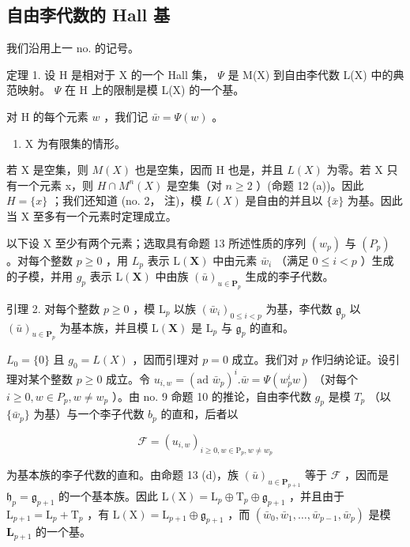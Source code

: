 \subsection{自由李代数的 Hall 基}

我们沿用上一 no. 的记号。

定理 1. 设 H 是相对于 X 的一个 Hall 集， \(\Psi\) 是 M(X) 到自由李代数 L(X) 中的典范映射。 \(\Psi\) 在 H 上的限制是模 L(X) 的一个基。

对 H 的每个元素 \(w\) ，我们记 \(\bar{w} = \Psi(w)\) 。

\begin{enumerate}
\def\labelenumi{(\Alph{enumi})}
\tightlist
\item
  X 为有限集的情形。
\end{enumerate}

若 X 是空集，则 \(M(X)\) 也是空集，因而 H 也是，并且 \(L(X)\) 为零。若 X 只有一个元素 x，则 \(H \cap M^{n}(X)\) 是空集（对 \(n \geqslant 2\) ）(命题 12 (a))。因此 \(H = \{x\}\) ；我们还知道 (no. 2， 注)，模 \(L(X)\) 是自由的并且以 \(\{\bar{x}\}\) 为基。因此当 X 至多有一个元素时定理成立。

以下设 X 至少有两个元素；选取具有命题 13 所述性质的序列 \((w_{p})\) 与 \((P_{p})\) 。对每个整数 \(p \geqslant 0\) ，用 \(L_{p}\) 表示 \(\mathrm{L}(\mathbf{X})\) 中由元素 \(\bar{w}_{i}\) （满足 \(0 \leqslant i < p\) ）生成的子模，并用 \(g_{p}\) 表示 \(\mathrm{L}(\mathbf{X})\) 中由族 \((\bar{u})_{u \in \mathbf{P}_{p}}\) 生成的李子代数。

引理 2. 对每个整数 \(p \geqslant 0\) ，模 \(\mathrm{L}_p\) 以族 \((\bar{w}_i)_{0 \leqslant i < p}\) 为基，李代数 \(\mathfrak{g}_p\) 以 \((\bar{u})_{u \in \mathbf{P}_p}\) 为基本族，并且模 \(\mathrm{L}(\mathbf{X})\) 是 \(\mathrm{L}_p\) 与 \(\mathfrak{g}_p\) 的直和。

\(L_{0} = \{0\}\) 且 \(g_{0} = L(X)\) ，因而引理对 \(p = 0\) 成立。我们对 \(p\) 作归纳论证。设引理对某个整数 \(p \geqslant 0\) 成立。令 \(u_{i,w} = (\text{ad } \bar{w}_{p})^{i}. \bar{w} = \Psi(w_{p}^{i} w)\) （对每个 \(i \geqslant 0, w \in P_{p}, w \neq w_{p}\) ）。由 no. 9 命题 10 的推论，自由李代数 \(g_{p}\) 是模 \(T_{p}\) （以 \(\{\bar{w}_{p}\}\) 为基）与一个李子代数 \(b_{p}\) 的直和，后者以

\[
\mathcal {F} = (u _ {i, w}) _ {i \geqslant 0, w \in \mathrm{P} _ {p}, w \neq w _ {p}}
\]

为基本族的李子代数的直和。由命题 13 (d)，族 \((\bar{u})_{u\in \mathbf{P}_{p + 1}}\) 等于 \(\mathcal{F}\) ，因而是 \(\mathfrak{h}_p = \mathfrak{g}_{p + 1}\) 的一个基本族。因此 \(\mathrm{L}(\mathrm{X}) = \mathrm{L}_p\oplus \mathrm{T}_p\oplus \mathfrak{g}_{p + 1}\) ，并且由于 \(\mathrm{L}_{p + 1} = \mathrm{L}_p + \mathrm{T}_p\) ，有 \(\mathrm{L}(\mathrm{X}) = \mathrm{L}_{p + 1}\oplus \mathfrak{g}_{p + 1}\) ，而 \((\bar{w}_0,\bar{w}_1,\dots ,\bar{w}_{p - 1},\bar{w}_p)\) 是模 \(\mathbf{L}_{p + 1}\) 的一个基。

